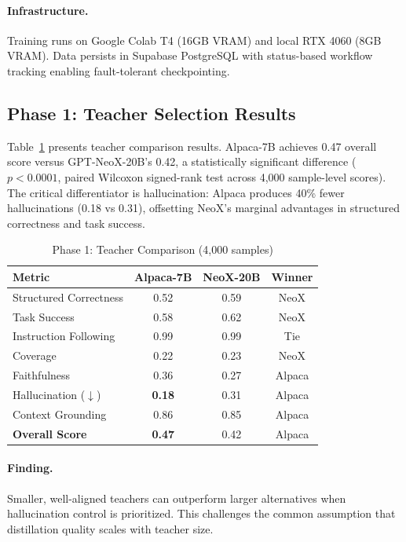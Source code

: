 \documentclass[sigconf]{acmart}
\begin{document}
\paragraph{Infrastructure.}
Training runs on Google Colab T4 (16GB VRAM) and local RTX 4060 (8GB VRAM). Data persists in Supabase PostgreSQL with status-based workflow tracking enabling fault-tolerant checkpointing.

\subsection{Phase 1: Teacher Selection Results}

Table~\ref{tab:phase1} presents teacher comparison results. Alpaca-7B achieves 0.47 overall score versus GPT-NeoX-20B's 0.42, a statistically significant difference ($p < 0.0001$, paired Wilcoxon signed-rank test across 4,000 sample-level scores). The critical differentiator is hallucination: Alpaca produces 40\% fewer hallucinations (0.18 vs 0.31), offsetting NeoX's marginal advantages in structured correctness and task success.

\begin{table}[t]
\caption{Phase 1: Teacher Comparison (4,000 samples)}
\label{tab:phase1}
\centering
\small
\begin{tabular}{lccc}
\toprule
\textbf{Metric} & \textbf{Alpaca-7B} & \textbf{NeoX-20B} & \textbf{Winner} \\
\midrule
Structured Correctness & 0.52 & 0.59 & NeoX \\
Task Success & 0.58 & 0.62 & NeoX \\
Instruction Following & 0.99 & 0.99 & Tie \\
Coverage & 0.22 & 0.23 & NeoX \\
Faithfulness & 0.36 & 0.27 & Alpaca \\
Hallucination ($\downarrow$) & \textbf{0.18} & 0.31 & Alpaca \\
Context Grounding & 0.86 & 0.85 & Alpaca \\
\midrule
\textbf{Overall Score} & \textbf{0.47} & 0.42 & Alpaca \\
\bottomrule
\end{tabular}
\end{table}

\paragraph{Finding.}
Smaller, well-aligned teachers can outperform larger alternatives when hallucination control is prioritized. This challenges the common assumption that distillation quality scales with teacher size.
\end{document}
